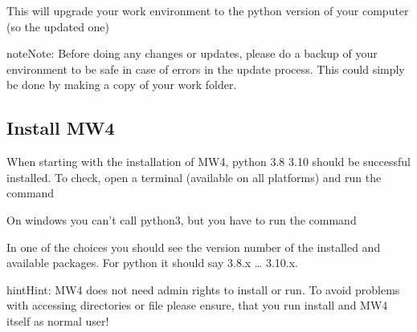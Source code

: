 \documentclass[a4paper,10pt,english]{sphinxmanual}
\begin{document}
\begin{sphinxVerbatim}[commandchars=\\\{\}]
    
\end{sphinxVerbatim}

\sphinxAtStartPar
This will upgrade your work environment to the python version of your computer (so
the updated one)

\begin{sphinxadmonition}{note}{Note:}
\sphinxAtStartPar
Before doing any changes or updates, please do a backup of your environment to
be safe in case of errors in the update process. This could simply be done by
making a copy of your work folder.
\end{sphinxadmonition}

\sphinxstepscope


\subsection{Install MW4}
\label{\detokenize{install/mw4:install-mw4}}\label{\detokenize{install/mw4::doc}}
\sphinxAtStartPar
When starting with the installation of MW4, python 3.8 \sphinxhyphen{} 3.10 should be successful
installed. To check, open a terminal (available on all platforms) and run the
command

\begin{sphinxVerbatim}[commandchars=\\\{\}]
 
 
\end{sphinxVerbatim}

\sphinxAtStartPar
On windows you can’t call python3, but you have to run the command

\begin{sphinxVerbatim}[commandchars=\\\{\}]
 
\end{sphinxVerbatim}

\sphinxAtStartPar
In one of the choices you should see the version number of the installed and
available packages. For python it should say 3.8.x … 3.10.x.

\begin{sphinxadmonition}{hint}{Hint:}
\sphinxAtStartPar
MW4 does not need admin rights to install or run. To avoid problems with
accessing directories or file please ensure, that you run install and MW4
itself as normal user!
\end{sphinxadmonition}
\end{document}
